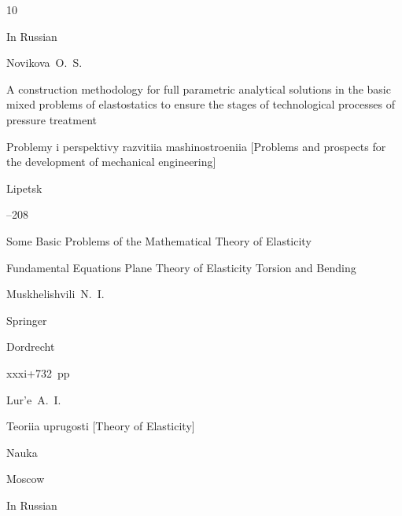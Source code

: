 




\begin{thebibliography}{10}




\lang In Russian

\by Novikova~O.~S.

\paper A construction  methodology for full parametric analytical solutions in the basic mixed problems of  elastostatics to ensure the stages of technological processes of pressure treatment

\inbook Problemy i perspektivy razvitiia mashinostroeniia  \rm [Problems and prospects for the development of mechanical engineering]



\publaddr Lipetsk 

--208






\book Some Basic Problems of the Mathematical Theory of Elasticity

\serial Fundamental Equations Plane Theory of Elasticity Torsion and Bending

\by Muskhelishvili~N.~I. 



\publ Springer

\publaddr Dordrecht 

\totalpages xxxi+732~pp \nofrills




\by Lur'e~A.~I.

\book Teoriia uprugosti \rm [Theory of Elasticity]


\publ Nauka

\publaddr Moscow


\lang In Russian







\end{thebibliography}
